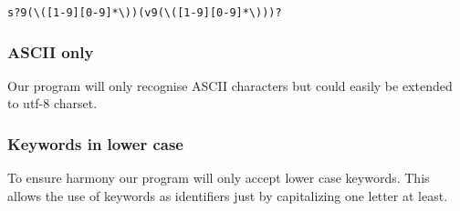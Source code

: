 \begin{verbatim}
s?9(\([1-9][0-9]*\))(v9(\([1-9][0-9]*\)))?
\end{verbatim}

\subsubsection{ASCII only}

Our program will only recognise ASCII characters but could easily be extended to utf-8 charset.

\subsubsection{Keywords in lower case}

To ensure harmony our program will only accept lower case keywords. This allows the use of keywords as identifiers just by capitalizing one letter at least.






